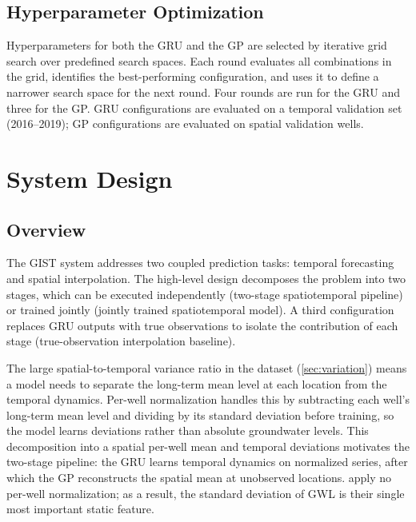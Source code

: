\subsection{Hyperparameter Optimization}
\label{subsec:hpo}

Hyperparameters for both the GRU and the GP are selected by iterative grid search over
predefined search spaces. Each round evaluates all combinations in the grid, identifies the
best-performing configuration, and uses it to define a narrower search space for the next
round. Four rounds are run for the GRU and three for the GP. GRU configurations are
evaluated on a temporal validation set (2016--2019); GP configurations are
evaluated on spatial validation wells.

\section{System Design}
\label{sec:system_design}

\subsection{Overview}
\label{sec:design_overview}

The GIST system addresses two coupled prediction tasks: temporal forecasting and spatial
interpolation. The high-level design decomposes the problem into two stages, which can be
executed independently (two-stage spatiotemporal pipeline) or trained jointly (jointly trained spatiotemporal model). A third
configuration replaces GRU outputs with true observations to isolate the contribution of
each stage (true-observation interpolation baseline).

The large spatial-to-temporal variance ratio in the dataset (\cref{sec:variation}) means a model needs to separate the long-term mean level at each location from the temporal dynamics. Per-well normalization handles this by subtracting each well's long-term mean level and dividing by its standard deviation before training, so the model learns deviations rather than absolute groundwater levels. This decomposition into a spatial per-well mean and temporal deviations motivates the two-stage pipeline: the GRU learns temporal dynamics on normalized series, after which the GP reconstructs the spatial mean at unobserved locations. \citet{kunz2025} apply no per-well normalization; as a result, the standard deviation of GWL is their single most important static feature.

